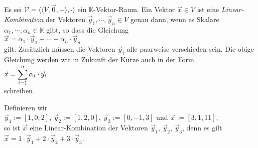 \begin{Definition} \lb
Es sei $\mathcal{V} = \bigl\langle \langle V, \vec{0}, + \rangle, \cdot \bigr\rangle$ ein $\mathbb{K}$-Vektor-Raum.  Ein Vektor $\vec{x} \in V$ ist eine
{\emph{\color{blue}Linear-Kombination}} der Vektoren $\vec{y}_1, \cdots, \vec{y}_n \in V$ genau dann, wenn es Skalare
$\alpha_1, \cdots, \alpha_n \in \mathbb{K}$ gibt, so dass die Gleichung
\\[0.2cm]
\hspace*{1.3cm}
$\vec{x} = \alpha_1 \cdot \vec{y}_1 + \cdots + \alpha_n \cdot \vec{y}_n$
\\[0.2cm]
gilt.  
Zus\"{a}tzlich m\"{u}ssen die Vektoren $\vec{y}_i$ alle {\color{red}paarweise verschieden} sein.
Die obige Gleichung werden wir in Zukunft der K\"{u}rze auch in der Form
\\[0.2cm]
\hspace*{1.3cm}
$\displaystyle \vec{x} = \sum\limits_{i=1}^n \alpha_i \cdot \vec{y}_i$
\\[0.2cm]
schreiben.
\eoxs
\end{Definition}

\example
Definieren wir
\\[0.2cm]
\hspace*{1.3cm}
$\vec{y}_1 := [1, 0, 2]$, \quad  $\vec{y}_2 := [1, 2, 0]$, \quad  $\vec{y}_3 := [0, -1, 3]$  \quad und \quad  $\vec{x} := [3, 1, 11]$,
\\[0.2cm]
so ist $\vec{x}$ eine Linear-Kombination der Vektoren $\vec{y}_1$, $\vec{y}_2$, $\vec{y}_3$, denn es gilt
\\[0.2cm]
\hspace*{1.3cm}
$\vec{x} = 1 \cdot \vec{y}_1 + 2 \cdot \vec{y}_2 + 3 \cdot \vec{y}_3$.  \eoxs
\pagebreak

